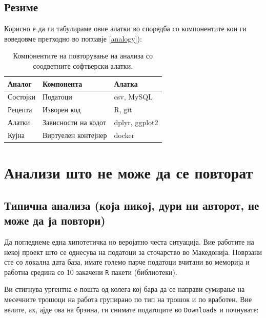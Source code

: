 \documentclass[
]{book}
\begin{document}
\hypertarget{ux440ux435ux437ux438ux43cux435}{%
\section{Резиме}\label{ux440ux435ux437ux438ux43cux435}}

Корисно е да ги табулираме овие алатки во споредба со компонентите кои ги воведовме претходно во поглавје \ref{analogy}):

\begin{table}

\caption{\label{tab:unnamed-chunk-1}Компонентите на повторување на анализа со соодветните софтверски алатки.}
\centering
\begin{tabular}[t]{l|l|l}
\hline
Аналог & Компонента & Алатка\\
\hline
Состојки & Податоци & csv, MySQL\\
\hline
Рецепта & Изворен код & R, git\\
\hline
Алатки & Зависности на кодот & dplyr, ggplot2\\
\hline
Кујна & Виртуелен контејнер & docker\\
\hline
\end{tabular}
\end{table}

\hypertarget{ux430ux43dux430ux43bux438ux437ux438-ux448ux442ux43e-ux43dux435-ux43cux43eux436ux435-ux434ux430-ux441ux435-ux43fux43eux432ux442ux43eux440ux430ux442}{%
\chapter{Анализи што не може да се повторат}\label{ux430ux43dux430ux43bux438ux437ux438-ux448ux442ux43e-ux43dux435-ux43cux43eux436ux435-ux434ux430-ux441ux435-ux43fux43eux432ux442ux43eux440ux430ux442}}

\hypertarget{typical}{%
\section{Типична анализа (која никој, дури ни авторот, не може да ја повтори)}\label{typical}}

Да погледнеме една хипотетичка но веројатно честа ситуација. Вие работите на некој проект што се однесува на податоци за сточарство во Македонија. Поврзани сте со локална дата база, имате големо парче податоци вчитани во меморија и работна средина со 10 закачени \texttt{R} пакети (библиотеки).

Ви стигнува ургентна е-пошта од колега кој бара да се направи сумирање на месечните трошоци на работа групирано по тип на трошок и по вработен. Вие велите, ах, ајде ова на брзина, ги снимате податоците во \texttt{Downloads} и почнувате:
\end{document}
